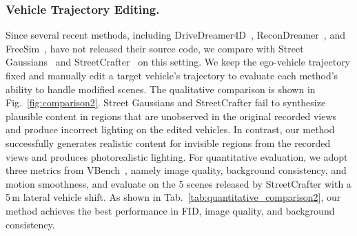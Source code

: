 \documentclass[runningheads]{llncs}
\begin{document}
\subsubsection{Vehicle Trajectory Editing.}
Since several recent methods, including DriveDreamer4D~\cite{zhao2024drive}, ReconDreamer~\cite{ni2025recondreamer}, and FreeSim~\cite{fan2025freesim}, have not released their source code, we compare with Street Gaussians~\cite{yan2024street} and StreetCrafter~\cite{yan2025streetcrafter} on this setting. We keep the ego-vehicle trajectory fixed and manually edit a target vehicle's trajectory to evaluate each method's ability to handle modified scenes. The qualitative comparison is shown in Fig.~\ref{fig:comparison2}. Street Gaussians and StreetCrafter fail to synthesize plausible content in regions that are unobserved in the original recorded views and produce incorrect lighting on the edited vehicles. In contrast, our method successfully generates realistic content for invisible regions from the recorded views and produces photorealistic lighting. For quantitative evaluation, we adopt three metrics from VBench~\cite{huang2023vbench}, namely image quality, background consistency, and motion smoothness, and evaluate on the 5 scenes released by StreetCrafter with a 5\,m lateral vehicle shift. As shown in Tab.~\ref{tab:quantitative_comparison2}, our method achieves the best performance in FID, image quality, and background consistency.




\end{document}
